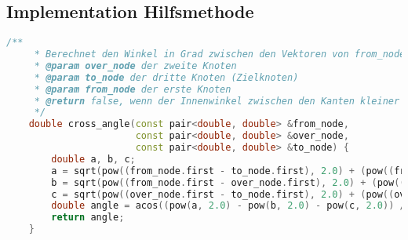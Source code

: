 \documentclass[a4paper,10pt,ngerman]{scrartcl}
\begin{document}
    \newpage
    \subsection{Implementation Hilfsmethode}\label{subsec:implementation-hilfsmethode}
    \begin{lstlisting}[frame=single,language=C++,title=Methode cross\_angle,breaklines=true,label={lst:code_crossAngle}]
    /**
     * Berechnet den Winkel in Grad zwischen den Vektoren von from_node nach over_node und over_node nach to_node
     * @param over_node der zweite Knoten
     * @param to_node der dritte Knoten (Zielknoten)
     * @param from_node der erste Knoten
     * @return false, wenn der Innenwinkel zwischen den Kanten kleiner als 90° beträgt, andernfalls true
     */
    double cross_angle(const pair<double, double> &from_node,
                       const pair<double, double> &over_node,
                       const pair<double, double> &to_node) {
        double a, b, c;
        a = sqrt(pow((from_node.first - to_node.first), 2.0) + (pow((from_node.second - to_node.second), 2.0)));
        b = sqrt(pow((from_node.first - over_node.first), 2.0) + (pow((from_node.second - over_node.second), 2.0)));
        c = sqrt(pow((over_node.first - to_node.first), 2.0) + (pow((over_node.second - to_node.second), 2.0)));
        double angle = acos((pow(a, 2.0) - pow(b, 2.0) - pow(c, 2.0)) / (-2 * b * c)) * 180 / M_PI;
        return angle;
    }
    \end{lstlisting}
\end{document}
